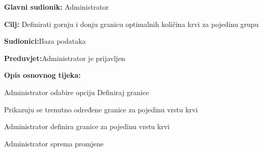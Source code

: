 \documentclass[11pt]{book}
\begin{document}
\noindent {}
\begin{packed_item}
	
	\item \textbf{Glavni sudionik: }{Administrator}
	\item  \textbf{Cilj:} {Definirati gornju i donju granicu optimalnih količina krvi za pojedinu grupu}
	\item  \textbf{Sudionici:}{Baza podataka}
	\item  \textbf{Preduvjet:}{Administrator je prijavljen}
	\item  \textbf{Opis osnovnog tijeka:}
	
	\item[] \begin{packed_enum}
		
		\item {Administrator odabire opciju Definiraj granice}
		\item {Prikazuju se trenutno određene granice za pojedinu vrstu krvi} 
		\item {Administrator definira granice za pojedinu vrstu krvi}
		\item {Administrator sprema promjene}
		
	\end{packed_enum}
\end{packed_item}
\end{document}
